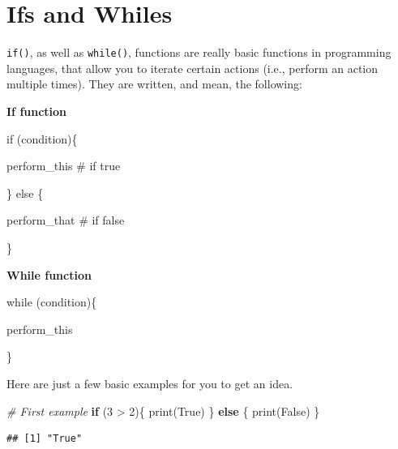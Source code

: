 \documentclass[
]{book}
\newenvironment{Shaded}{\begin{snugshade}}{\end{snugshade}}
\newcommand{\CommentTok}[1]{\textcolor[rgb]{0.56,0.35,0.01}{\textit{#1}}}
\newcommand{\ControlFlowTok}[1]{\textcolor[rgb]{0.13,0.29,0.53}{\textbf{#1}}}
\newcommand{\DecValTok}[1]{\textcolor[rgb]{0.00,0.00,0.81}{#1}}
\newcommand{\FunctionTok}[1]{\textcolor[rgb]{0.00,0.00,0.00}{#1}}
\newcommand{\NormalTok}[1]{#1}
\newcommand{\SpecialCharTok}[1]{\textcolor[rgb]{0.00,0.00,0.00}{#1}}
\newcommand{\StringTok}[1]{\textcolor[rgb]{0.31,0.60,0.02}{#1}}
\begin{document}
\hypertarget{ifs-and-whiles}{%
\section{Ifs and Whiles}\label{ifs-and-whiles}}

\texttt{if()}, as well as \texttt{while()}, functions are really basic functions in programming languages, that allow you to iterate certain actions (i.e., perform an action multiple times).
They are written, and mean, the following:

\textbf{If function}

if (condition)\{

perform\_this \# if true

\} else \{

perform\_that \# if false

\}

\textbf{While function}

while (condition)\{

perform\_this

\}

Here are just a few basic examples for you to get an idea.

\begin{Shaded}
\begin{Highlighting}[]
\CommentTok{\# First example}
\ControlFlowTok{if}\NormalTok{ (}\DecValTok{3} \SpecialCharTok{\textgreater{}} \DecValTok{2}\NormalTok{)\{}
  \FunctionTok{print}\NormalTok{(}\StringTok{\textquotesingle{}True\textquotesingle{}}\NormalTok{)}
\NormalTok{\} }\ControlFlowTok{else}\NormalTok{ \{}
  \FunctionTok{print}\NormalTok{(}\StringTok{\textquotesingle{}False\textquotesingle{}}\NormalTok{)}
\NormalTok{\}}
\end{Highlighting}
\end{Shaded}

\begin{verbatim}
## [1] "True"
\end{verbatim}
\end{document}
